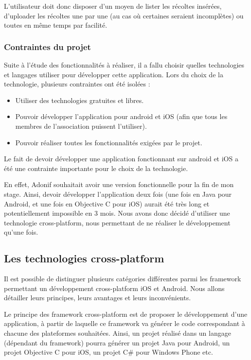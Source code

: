 \documentclass[11pt, a4paper, twoside]{report}
\begin{document}
L'utilisateur doit donc disposer d'un moyen de lister les récoltes insérées, d'uploader les récoltes une par une (au cas où certaines seraient incomplètes) ou toutes en même temps par facilité.

\subsubsection{Contraintes du projet}
Suite à l'étude des fonctionnalités à réaliser, il a fallu choisir quelles technologies et langages utiliser pour développer cette application. 
Lors du choix de la technologie, plusieurs contraintes ont été isolées :
\begin{itemize}
\item Utiliser des technologies gratuites et libres.
\item Pouvoir développer l'application pour android et iOS (afin que tous les membres de l'association puissent l'utiliser).
\item Pouvoir réaliser toutes les fonctionnalités exigées par le projet.
\end{itemize}

Le fait de devoir développer une application fonctionnant sur android et iOS a été une contrainte importante pour le choix de la technologie.

En effet, Adonif souhaitait avoir une version fonctionnelle pour la fin de mon stage. Ainsi, devoir développer l'application deux fois (une fois en Java pour Android, et une fois en Objective C pour iOS) aurait été très long et potentiellement impossible en 3 mois. Nous avons donc décidé d'utiliser une technologie cross-platform, nous permettant de ne réaliser le développement qu'une fois.

\subsection{Les technologies cross-platform }

Il est possible de distinguer plusieurs catégories différentes parmi les framework permettant un développement cross-platform iOS et Android. Nous allons détailler leurs principes, leurs avantages et leurs inconvénients.

Le principe des framework cross-platform est de proposer le développement d'une application, à partir de laquelle ce framework va générer le code correspondant à chacune des plateformes souhaitées. Ainsi, un projet réalisé dans un langage (dépendant du framework) pourra générer un projet Java pour Android, un projet Objective C pour iOS, un projet C\# pour Windows Phone etc.
\end{document}
